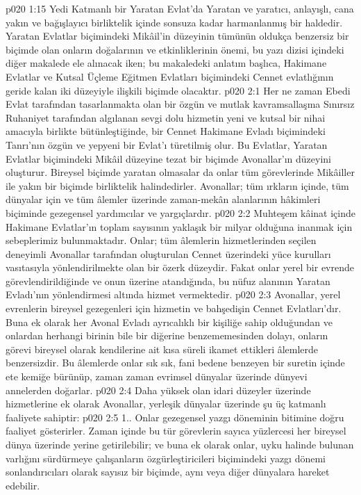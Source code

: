 \vs p020 1:15 Yedi Katmanlı bir Yaratan Evlat’da Yaratan ve yaratıcı, anlayışlı, cana yakın ve bağışlayıcı birliktelik içinde sonsuza kadar harmanlanmış bir haldedir. Yaratan Evlatlar biçimindeki Mikâil’in düzeyinin tümünün oldukça benzersiz bir biçimde olan onların doğalarının ve etkinliklerinin önemi, bu yazı dizisi içindeki diğer makalede ele alınacak iken; bu makaledeki anlatım başlıca, Hakimane Evlatlar ve Kutsal Üçleme Eğitmen Evlatları biçimindeki Cennet evlatlığının geride kalan iki düzeyiyle ilişkili biçimde olacaktır.
\vs p020 2:1 Her ne zaman Ebedi Evlat tarafından tasarlanmakta olan bir özgün ve mutlak kavramsallaşma Sınırsız Ruhaniyet tarafından algılanan sevgi dolu hizmetin yeni ve kutsal bir nihai amacıyla birlikte bütünleştiğinde, bir Cennet Hakimane Evladı biçimindeki Tanrı’nın özgün ve yepyeni bir Evlat’ı türetilmiş olur. Bu Evlatlar, Yaratan Evlatlar biçimindeki Mikâil düzeyine tezat bir biçimde Avonallar’ın düzeyini oluşturur. Bireysel biçimde yaratan olmasalar da onlar tüm görevlerinde Mikâiller ile yakın bir biçimde birliktelik halindedirler. Avonallar; tüm ırkların içinde, tüm dünyalar için ve tüm âlemler üzerinde zaman\hyp{}mekân alanlarının hâkimleri biçiminde gezegensel yardımcılar ve yargıçlardır.
\vs p020 2:2 Muhteşem kâinat içinde Hakimane Evlatlar’ın toplam sayısının yaklaşık bir milyar olduğuna inanmak için sebeplerimiz bulunmaktadır. Onlar; tüm âlemlerin hizmetlerinden seçilen deneyimli Avonallar tarafından oluşturulan Cennet üzerindeki yüce kurulları vasıtasıyla yönlendirilmekte olan bir özerk düzeydir. Fakat onlar yerel bir evrende görevlendirildiğinde ve onun üzerine atandığında, bu nüfuz alanının Yaratan Evladı’nın yönlendirmesi altında hizmet vermektedir.
\vs p020 2:3 Avonallar, yerel evrenlerin bireysel gezegenleri için hizmetin ve bahşedişin Cennet Evlatları’dır. Buna ek olarak her Avonal Evladı ayrıcalıklı bir kişiliğe sahip olduğundan ve onlardan herhangi birinin bile bir diğerine benzememesinden dolayı, onların görevi bireysel olarak kendilerine ait kısa süreli ikamet ettikleri âlemlerde benzersizdir. Bu âlemlerde onlar sık sık, fani bedene benzeyen bir suretin içinde ete kemiğe bürünüp, zaman zaman evrimsel dünyalar üzerinde dünyevi annelerden doğarlar.
\vs p020 2:4 Daha yüksek olan idari düzeyler üzerinde hizmetlerine ek olarak Avonallar, yerleşik dünyalar üzerinde şu üç katmanlı faaliyete sahiptir:
\vs p020 2:5 1.. Onlar gezegensel yazgı döneminin bitimine doğru faaliyet gösterirler. Zaman içinde bu tür görevlerin sayıca yüzlercesi her bireysel dünya üzerinde yerine getirilebilir; ve buna ek olarak onlar, uyku halinde bulunan varlığını sürdürmeye çalışanların özgürleştiricileri biçimindeki yazgı dönemi sonlandırıcıları olarak sayısız bir biçimde, aynı veya diğer dünyalara hareket edebilir.
